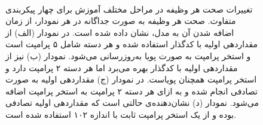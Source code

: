 \begin{figure}
	\centering
	\quad
	\\
	\quad
	\caption[تغییرات صحت هر وظیفه در هر گام آموزشی در مجموعه‌داده‌ی
	 ]
	{
تغییرات صحت هر وظیفه در مراحل مختلف آموزش برای چهار پیکربندی متفاوت. صحت هر وظیفه به صورت جداگانه در هر نمودار، از زمان اضافه شدن آن به مدل، نشان داده شده است. در نمودار (الف) از مقداردهی اولیه با کدگذار  استفاده شده و هر دسته شامل ۵ پرامپت است و استخر پرامپت به صورت پویا به‌روزرسانی می‌شود. نمودار (ب) نیز از مقداردهی اولیه با کدگذار   بهره می‌برد اما هر دسته ۲ پرامپت دارد و استخر پرامپت همچنان پویاست. در نمودار (ج) مقداردهی اولیه به صورت تصادفی انجام شده و به ازای هر دسته ۲ پرامپت به استخر پرامپت اضافه می‌شود. نمودار (د) نشان‌دهنده‌ی حالتی است که مقداردهی اولیه تصادفی بوده و از یک استخر پرامپت ثابت با اندازه ۱۰۲ استفاده شده است.
	}
	\label{fig:ablation_study_ucf101}
\end{figure}

